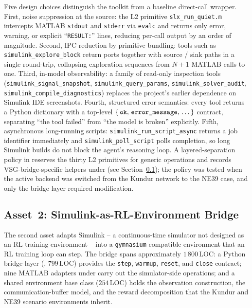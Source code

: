 \documentclass{unnc-fyp}
\begin{document}
Five design choices distinguish the toolkit from a baseline
direct-call wrapper.
First, noise suppression at the source: the L2 primitive
\verb|slx_run_quiet.m| intercepts MATLAB \verb|stdout| and
\verb|stderr| via \verb|evalc| and returns only error, warning,
or explicit ``\verb|RESULT:|'' lines, reducing per-call output by
an order of magnitude.
Second, IPC reduction by primitive bundling: tools such as
\verb|simulink_explore_block| return ports together with
source / sink paths in a single round-trip, collapsing
exploration sequences from $N+1$ MATLAB calls to one.
Third, in-model observability: a family of read-only inspection
tools (\verb|simulink_signal_snapshot|,
\verb|simulink_query_params|, \verb|simulink_solver_audit|,
\verb|simulink_compile_diagnostics|) replaces the project's
earlier dependence on Simulink IDE screenshots.
Fourth, structured error semantics: every tool returns a Python
dictionary with a top-level
$\{\,\verb|ok|,\,\verb|error_message|,\,\dots\,\}$ contract,
separating ``the tool failed'' from ``the model is broken''
explicitly.
Fifth, asynchronous long-running scripts:
\verb|simulink_run_script_async| returns a job identifier
immediately and \verb|simulink_poll_script| polls completion, so
long Simulink builds do not block the agent's reasoning loop.
A layered-separation policy in 
reserves the thirty L2 primitives for generic operations and
records VSG-bridge-specific helpers under
 (see Section~\ref{sec:asset-rl-bridge});
the policy was tested when the active backend was switched from
the Kundur network to the NE39 case, and only the bridge layer
required modification.

\subsection{Asset~2: Simulink-as-RL-Environment Bridge}
\label{sec:asset-rl-bridge}

The second asset adapts Simulink -- a continuous-time simulator
not designed as an RL training environment -- into a
\texttt{gymnasium}-compatible environment that an RL training
loop can step.
The bridge spans approximately $1\,800$\,LOC: a Python bridge
layer (, $799$\,LOC) provides
the \verb|step|, \verb|warmup|, \verb|reset|, and \verb|close|
contract; nine MATLAB adapters under
 carry out the simulator-side
operations; and a shared environment base class
 ($254$\,LOC) holds the observation
construction, the communication-buffer model, and the reward
decomposition that the Kundur and NE39 scenario environments
inherit.
\end{document}
